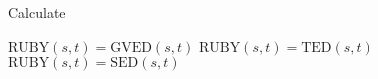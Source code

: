 
\makeatletter
\def\BState{\State\hskip-\ALG@thistlm}
\makeatother
\begin{algorithm}
\caption{Calculate {\model}}\label{euclid}
\begin{algorithmic}[1]
\State $\mbox{RUBY}\left(s,t\right) = \mbox{GVED}\left(s,t\right) $
\State $\mbox{RUBY}\left(s,t\right) = \mbox{TED}\left(s,t\right) $
\Else 
\State $\mbox{RUBY}\left(s,t\right) = \mbox{SED}\left(s,t\right) $
\EndIf
\end{algorithmic}
\end{algorithm}